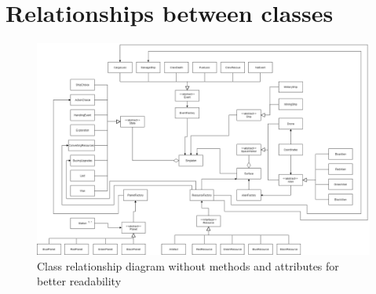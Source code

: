 \documentclass[a4paper,12pt]{article}
\begin{document}
\section{Relationships between classes}
\begin{figure}[H]
	\caption{Class relationship diagram without methods and attributes for better readability}
	\includegraphics[scale=0.25]{ClassRelationship.png}
\end{figure}
\end{document}
